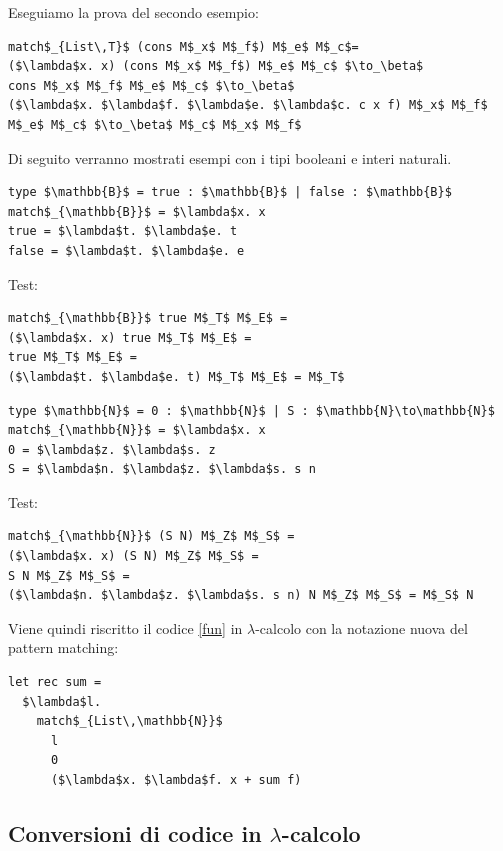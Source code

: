 \documentclass{article}
\begin{document}
Eseguiamo la prova del secondo esempio:
\begin{lstlisting}[mathescape=true]
match$_{List\,T}$ (cons M$_x$ M$_f$) M$_e$ M$_c$=
($\lambda$x. x) (cons M$_x$ M$_f$) M$_e$ M$_c$ $\to_\beta$
cons M$_x$ M$_f$ M$_e$ M$_c$ $\to_\beta$
($\lambda$x. $\lambda$f. $\lambda$e. $\lambda$c. c x f) M$_x$ M$_f$ M$_e$ M$_c$ $\to_\beta$ M$_c$ M$_x$ M$_f$
\end{lstlisting}

\bigskip

Di seguito verranno mostrati esempi con i tipi booleani e interi naturali.
\begin{lstlisting}[mathescape=true]
type $\mathbb{B}$ = true : $\mathbb{B}$ | false : $\mathbb{B}$
match$_{\mathbb{B}}$ = $\lambda$x. x
true = $\lambda$t. $\lambda$e. t
false = $\lambda$t. $\lambda$e. e
\end{lstlisting}
Test:
\begin{lstlisting}[mathescape=true]
match$_{\mathbb{B}}$ true M$_T$ M$_E$ =
($\lambda$x. x) true M$_T$ M$_E$ =
true M$_T$ M$_E$ =
($\lambda$t. $\lambda$e. t) M$_T$ M$_E$ = M$_T$
\end{lstlisting}

\bigskip

\begin{lstlisting}[mathescape=true]
type $\mathbb{N}$ = 0 : $\mathbb{N}$ | S : $\mathbb{N}\to\mathbb{N}$
match$_{\mathbb{N}}$ = $\lambda$x. x
0 = $\lambda$z. $\lambda$s. z
S = $\lambda$n. $\lambda$z. $\lambda$s. s n
\end{lstlisting}
Test:
\begin{lstlisting}[mathescape=true]
match$_{\mathbb{N}}$ (S N) M$_Z$ M$_S$ =
($\lambda$x. x) (S N) M$_Z$ M$_S$ =
S N M$_Z$ M$_S$ =
($\lambda$n. $\lambda$z. $\lambda$s. s n) N M$_Z$ M$_S$ = M$_S$ N
\end{lstlisting}

\bigskip

Viene quindi riscritto il codice \ref{fun} in $\lambda$-calcolo con la notazione nuova del pattern matching:
\begin{lstlisting}[mathescape=true]
let rec sum =
  $\lambda$l.
    match$_{List\,\mathbb{N}}$
      l
      0
      ($\lambda$x. $\lambda$f. x + sum f)
\end{lstlisting}

\subsection{Conversioni di codice in $\lambda$-calcolo}
\end{document}

